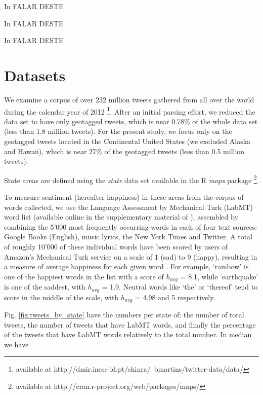 \documentclass{llncs}
\begin{document}
In \cite{Schwartz2013} FALAR DESTE

In \cite{Bertrand2013} FALAR DESTE

In \cite{Connor2010} FALAR DESTE


\section{Datasets}
\label{sec:datasets}

We examine a corpus of over 232 million tweets gathered from all over the world during the calendar year of 2012 \footnote{available at http://dmir.inesc-id.pt/shinra/~bmartins/twitter-data/data/}. After an initial parsing effort, we reduced the data set to have only geotagged tweets, which is near 0.78\% of the whole data set (less than 1.8 million tweets). For the present study, we focus only on the geotagged tweets located in the Continental United States (we excluded Alaska and Hawaii), which is near 27\% of the geotagged tweets (less than 0.5 million tweets).

State areas are defined using the \emph{state} data set available in the R \emph{maps} package \footnote{available at http://cran.r-project.org/web/packages/maps/}.

To measure sentiment (hereafter happiness) in these areas from the corpus of words collected, we use the Language Assessment by Mechanical Turk (LabMT) word list (available online in the supplementary material of \cite{Dodds2011}), assembled by combining the 5'000 most frequently occurring words in each of four text sources: Google Books (English), music lyrics, the New York Times and Twitter. A total of roughly 10'000 of these individual words have been scored by users of Amazon’s Mechanical Turk service on a scale of 1 (sad) to 9 (happy), resulting in a measure of average happiness for each given word \cite{Kloumann2012}. For example, ‘rainbow’ is one of the happiest words in the list with a score of $h_{avg}$ = 8.1, while ‘earthquake’ is one of the saddest, with $h_{avg}$ = 1.9. Neutral words like ‘the’ or ‘thereof’ tend to score in the middle of the scale, with $h_{avg}$ = 4.98 and 5 respectively.

Fig. \ref{fig:tweets_by_state} have the numbers per state of: the number of total tweets, the number of tweets that have LabMT words, and finally the percentage of the tweets that have LabMT words relatively to the total number. In median we have
\end{document}
